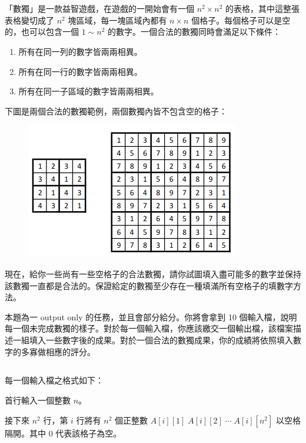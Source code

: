 


\section*{}
\subsection*{}
「數獨」是一款益智遊戲，在遊戲的一開始會有一個 $n^2\times n^2$ 的表格，其中這整張表格變切成了 $n^2$ 塊區域，每一塊區域內都有 $n\times n$ 個格子。每個格子可以是空的，也可以包含一個 $1\sim n^2$ 的數字。一個合法的數獨同時會滿足以下條件：
\begin{enumerate}
    \item 所有在同一列的數字皆兩兩相異。
    \item 所有在同一行的數字皆兩兩相異。
    \item 所有在同一子區域的數字皆兩兩相異。
\end{enumerate}
下圖是兩個合法的數獨範例，兩個數獨內皆不包含空的格子：

\begin{figure}[htp]
    \centering
    \includegraphics[width=0.5\linewidth]{board.png}
\end{figure}

現在，給你一些尚有一些空格子的合法數獨，請你試圖填入盡可能多的數字並保持該數獨一直都是合法的。保證給定的數獨至少存在一種填滿所有空格子的填數字方法。

本題為一 output only 的任務，並且會部分給分。你將會拿到 10 個輸入檔，說明每一個未完成數獨的樣子。對於每一個輸入檔，你應該繳交一個輸出檔，該檔案描述一組填入一些數字後的成果。對於一個合法的數獨成果，你的成績將依照填入數字的多寡做相應的評分。
\subsection*{}
每一個輸入檔之格式如下：

首行輸入一個整數 $n$。

接下來 $n^2$ 行，第 $i$ 行將有 $n^2$ 個正整數 $A[i][1]\;A[i][2]\;\cdots\;A[i][n^2]$ 以空格隔開。其中 $0$ 代表該格子為空。
